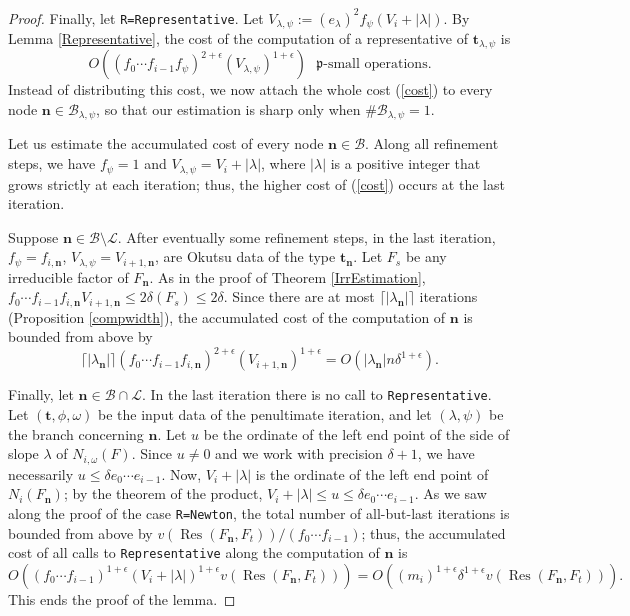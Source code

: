 \documentclass{amsart}
\begin{document}
\begin{proof}
Finally, let {\tt R=Representative}. Let $V_{\lambda,\psi}:=(e_\lambda)^2 f_\psi(V_i+|\lambda|)$. By Lemma \ref{Representative}, the cost of the computation of a representative of ${\mathbf{t}}_{\lambda,\psi}$ is 
\begin{equation}\label{cost}
O\left((f_0\cdots f_{i-1}f_\psi)^{2+\epsilon}(V_{\lambda,\psi})^{1+\epsilon}\right) \mbox{ ${\mathfrak{p}}$-small operations}.
\end{equation}
Instead of distributing this cost, we now attach the whole cost (\ref{cost}) to every node ${\mathbf{n}}\in{{\mathcal B}}_{\lambda,\psi}$, so that our estimation is sharp only when $\#{{\mathcal B}}_{\lambda,\psi}=1$. 

Let us estimate the accumulated cost of every node ${\mathbf{n}}\in{{\mathcal B}}$. Along all refinement steps, we have $f_\psi=1$ and $V_{\lambda,\psi}=V_i+|\lambda|$, where $|\lambda|$ is a positive integer that grows strictly at each iteration; thus, the higher cost of (\ref{cost}) occurs at the last iteration. 

Suppose ${\mathbf{n}}\in{{\mathcal B}}\setminus{\mathcal{L}}$. After eventually some refinement steps, in the last ite\-ration, $f_\psi=f_{i,{\mathbf{n}}}$, $V_{\lambda,\psi}=V_{i+1,{\mathbf{n}}}$, are Okutsu data of the type ${\mathbf{t}}_{\mathbf{n}}$. Let $F_s$ be any irreducible factor of $F_{\mathbf{n}}$. As in the proof of Theorem \ref{IrrEstimation}, $ f_0\cdots f_{i-1}f_{i,{\mathbf{n}}}V_{i+1,{\mathbf{n}}}\le 2\delta(F_s)\le 2\delta$.
Since there are at most $\lceil |\lambda_{\mathbf{n}}|\rceil$ iterations (Proposition \ref{compwidth}), the accumulated cost of the computation of ${\mathbf{n}}$ is bounded from above by
$$
\lceil |\lambda_{\mathbf{n}}|\rceil (f_0\cdots f_{i-1}f_{i,{\mathbf{n}}})^{2+\epsilon}(V_{i+1,{\mathbf{n}}})^{1+\epsilon}=O\left( |\lambda_{\mathbf{n}}| n\delta^{1+\epsilon}\right).
$$

Finally, let ${\mathbf{n}}\in{{\mathcal B}}\cap{\mathcal{L}}$. In the last iteration there is no call to {\tt Representative}. Let $({\mathbf{t}},\phi,\omega)$ be the input data of the penultimate iteration, and let $(\lambda,\psi)$ be the branch concerning ${\mathbf{n}}$. Let $u$ be the ordinate of the left end point of the side of slope $\lambda$ of $N_{i,\omega}(F)$. Since $u\ne0$ and we work with precision $\delta+1$, we have necessarily $u\le \delta e_0\cdots e_{i-1}$. Now, $V_i+|\lambda|$ is the ordinate of the left end point of $N_i(F_{\mathbf{n}})$; by the theorem of the product, $V_i+|\lambda|\le u\le \delta e_0\cdots e_{i-1}$.  
As we saw along the proof of the case {\tt R=Newton}, the total number of all-but-last iterations is bounded from above by $v({\operatorname{Res}}(F_{\mathbf{n}},F_t))/(f_0\cdots f_{i-1})$; thus, the accumulated cost of all calls to {\tt Representative} along the computation of ${\mathbf{n}}$ is 
$$
O\left((f_0\cdots f_{i-1})^{1+\epsilon}(V_i+|\lambda|)^{1+\epsilon}v({\operatorname{Res}}(F_{\mathbf{n}},F_t))\right)=O\left((m_i)^{1+\epsilon}\delta^{1+\epsilon}v({\operatorname{Res}}(F_{\mathbf{n}},F_t))\right).
$$
This ends the proof of the lemma.
\end{proof}
\end{document}
